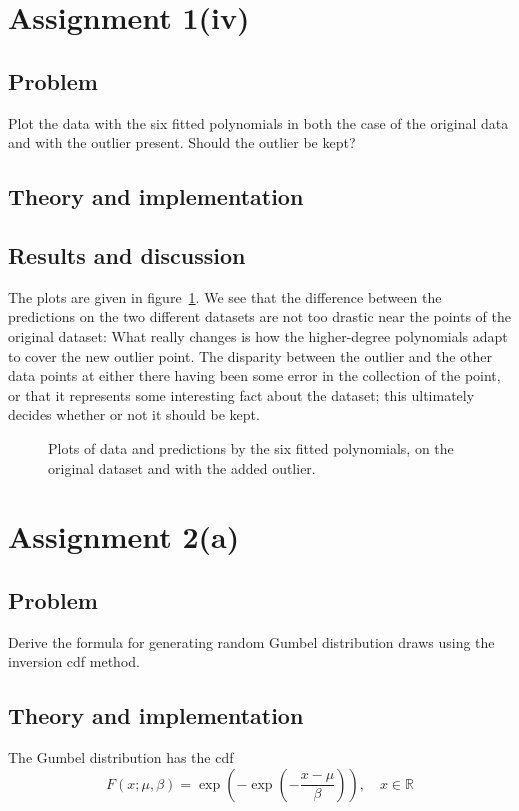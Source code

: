 \documentclass[11pt, a4paper]{article}
\begin{document}
\section{Assignment 1(iv)}
\subsection{Problem}
Plot the data with the six fitted polynomials
in both the case of the original data and with the outlier present.
Should the outlier be kept?
\subsection{Theory and implementation}
\subsection{Results and discussion}
The plots are given in figure~\ref{fig:predictions}.
We see that the difference between the predictions on the two different datasets
are not too drastic near the points of the original dataset:
What really changes is how the higher-degree polynomials adapt to cover the new outlier point.
The disparity between the outlier and the other data points at either
there having been some error in the collection of the point,
or that it represents some interesting fact about the dataset;
this ultimately decides whether or not it should be kept.

\begin{figure}
	\centering
	
	\caption{Plots of data and predictions by the six fitted polynomials,
	on the original dataset and with the added outlier. \label{fig:predictions}}
\end{figure}


\section{Assignment 2(a)}
\subsection{Problem}
Derive the formula for generating random Gumbel distribution draws using the inversion cdf method.
\subsection{Theory and implementation}
The Gumbel distribution has the cdf
$$ F(x; \mu, \beta) = \exp\left(-\exp\left(-\frac{x-\mu}\beta\right)\right), \quad x \in \mathbb{R} $$
\end{document}
